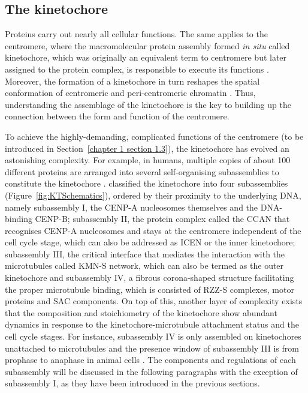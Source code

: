 
\subsection{The kinetochore}
\label{chapter 1 section 1.2.3}

Proteins carry out nearly all cellular functions. The same applies to the centromere, where the macromolecular protein assembly formed \textit{in situ} called kinetochore, which was originally an equivalent term to centromere \citep{Sharp1921IntroductionCytology, Darlington1936TheEnquiry} but later assigned to the protein complex, is responsible to execute its functions \citep{McAinsh2022TheKinetochores, McKinley2015TheFunction, Musacchio2017AFunction}. Moreover, the formation of a kinetochore in turn reshapes the spatial conformation of centromeric and peri-centromeric chromatin \citep{McAinsh2022TheKinetochores}. Thus, understanding the assemblage of the kinetochore is the key to building up the connection between the form and function of the centromere.

To achieve the highly-demanding, complicated functions of the centromere (to be introduced in Section~\ref{chapter 1 section 1.3}), the kinetochore has evolved an astonishing complexity. For example, in humans, multiple copies of about 100 different proteins are arranged into several self-organising subassemblies to constitute the kinetochore \citep{Cheeseman2014TheKinetochore}. \cite{McAinsh2022TheKinetochores} classified the kinetochore into four subassemblies (Figure~\ref{fig:KTSchematics}), ordered by their proximity to the underlying DNA, namely subassembly I, the CENP-A nucleosomes themselves and the DNA-binding CENP-B; subassembly II, the protein complex called the CCAN that recognises CENP-A nucleosomes and stays at the centromere independent of the cell cycle stage, which can also be addressed as ICEN or the inner kinetochore; subassembly III, the critical interface that mediates the interaction with the microtubules called KMN-S network, which can also be termed as the outer kinetochore and subassembly IV, a fibrous corona-shaped structure facilitating the proper microtubule binding, which is consisted of RZZ-S complexes, motor proteins and SAC components. On top of this, another layer of complexity exists that the composition and stoichiometry of the kinetochore show abundant dynamics in response to the kinetochore-microtubule attachment status and the cell cycle stages. For instance, subassembly IV is only assembled on kinetochores unattached to microtubules and the presence window of subassembly III is from prophase to anaphase in animal cells \citep{Hara2020DynamicsProgression}. The components and regulations of each subassembly will be discussed in the following paragraphs with the exception of subassembly I, as they have been introduced in the previous sections. 

